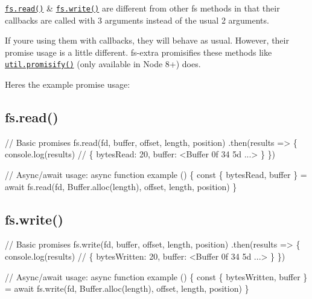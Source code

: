 \href{https://nodejs.org/api/fs.html#fs_fs_read_fd_buffer_offset_length_position_callback}{\tt {\ttfamily fs.\+read()}} \& \href{https://nodejs.org/api/fs.html#fs_fs_write_fd_buffer_offset_length_position_callback}{\tt {\ttfamily fs.\+write()}} are different from other {\ttfamily fs} methods in that their callbacks are called with 3 arguments instead of the usual 2 arguments.

If you\textquotesingle{}re using them with callbacks, they will behave as usual. However, their promise usage is a little different. {\ttfamily fs-\/extra} promisifies these methods like \href{https://nodejs.org/api/util.html#util_util_promisify_original}{\tt {\ttfamily util.\+promisify()}} (only available in Node 8+) does.

Here\textquotesingle{}s the example promise usage\+:

\subsection*{{\ttfamily fs.\+read()}}


\begin{DoxyCode}
// Basic promises
fs.read(fd, buffer, offset, length, position)
  .then(results => \{
    console.log(results)
    // \{ bytesRead: 20, buffer: <Buffer 0f 34 5d ...> \}
  \})

// Async/await usage:
async function example () \{
  const \{ bytesRead, buffer \} = await fs.read(fd, Buffer.alloc(length), offset, length, position)
\}
\end{DoxyCode}


\subsection*{{\ttfamily fs.\+write()}}


\begin{DoxyCode}
// Basic promises
fs.write(fd, buffer, offset, length, position)
  .then(results => \{
    console.log(results)
    // \{ bytesWritten: 20, buffer: <Buffer 0f 34 5d ...> \}
  \})

// Async/await usage:
async function example () \{
  const \{ bytesWritten, buffer \} = await fs.write(fd, Buffer.alloc(length), offset, length, position)
\}
\end{DoxyCode}
 